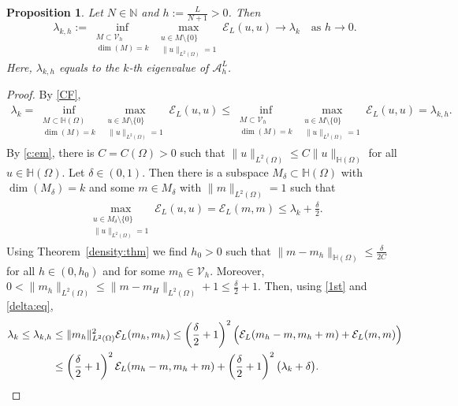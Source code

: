 \documentclass[11 pt]{article}
\newtheorem{proposition}[theorem]{Proposition}
\numberwithin{equation}{section}
\def\mH{\mathbb{H}}
\begin{document}
\begin{proposition}\label{prop:eigen-approx}
Let $N\in \mathbb N$ and $h:=\frac{L}{N+1}>0$. Then
$$
\lambda_{k,h}:=\inf_{\substack{M\subset \mathcal{V}_{h}\\ \dim(M)=k}} \max_{\substack{u\in M\setminus\{0\}\\ \|u\|_{L^2(\Omega)}=1}} \mathcal{E}_L(u,u)\to \lambda_k\quad\text{as $h\to 0$.}
$$
Here, $\lambda_{k,h}$ equals to the $k$-th eigenvalue of $\mathcal{A}^L_{h}$.
\end{proposition}
\begin{proof}
By \eqref{CF}, 
\begin{align}\label{1st}
\lambda_k=\inf_{\substack{M\subset \mH(\Omega)\\ \dim(M)=k}} \max_{\substack{u\in M\setminus\{0\}\\ \|u\|_{L^2(\Omega)}=1}} \mathcal{E}_L(u,u)\leq \inf_{\substack{M\subset \mathcal{V}_{h}\\ \dim(M)=k}} \max_{\substack{u\in M\setminus\{0\}\\ \|u\|_{L^2(\Omega)}=1}} \mathcal{E}_L(u,u)=\lambda_{k,h}. 
\end{align}
 By \eqref{c:em}, there is $C=C(\Omega)>0$ such that $\|u\|_{L^2(\Omega)}\leq C\|u\|_{\mH(\Omega)}$ for all $u\in \mH(\Omega)$. Let  $\delta\in(0,1)$. Then there is a subspace $M_{\delta}\subset \mH(\Omega)$ with $\dim(M_{\delta})=k$ and some $m\in M_{\delta}$ with $\|m\|_{L^2(\Omega)}=1$ such that
\begin{align}\label{delta:eq}
\max_{\substack{ u\in M_{\delta}\setminus \{0\}\\ \|u\|_{L^2(\Omega)}=1}} \mathcal{E}_L(u,u)=\mathcal{E}_{L}(m,m)\leq \lambda_k+\frac{\delta}{2}. 
\end{align}
Using Theorem~\ref{density:thm} we find $h_0>0$ such that $\|m-m_h\|_{\mH(\Omega)}\leq \frac{\delta}{2C}$ for all $h\in(0,h_0)$ and for some $m_h\in {\mathcal V}_h$. Moreover, $0<\|m_h\|_{L^2(\Omega)}\leq \|m-m_H\|_{L^2(\Omega)}+1\leq \frac{\delta}{2}+1
$. Then, using \eqref{1st} and \eqref{delta:eq},
\begin{align}\notag 
\lambda_{k}\leq \lambda_{k,h}&\leq \|m_h\|_{L^2(\Omega)}^2 \mathcal{E}_L(m_h,m_h)\leq \left( \frac{\delta}{2}+1\right)^2\Big(\mathcal{E}_L(m_h-m,m_h+m)+\mathcal{E}_L(m,m)\Big)\notag\\
&\leq \left( \frac{\delta}{2}+1\right)^2\mathcal{E}_L(m_h-m,m_h+m)
+\left( \frac{\delta}{2}+1\right)^2\big(\lambda_k+\delta\big).\label{lambda-k-upperbound}
\end{align}

\end{proof}
\end{document}
